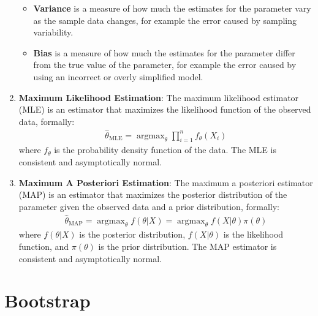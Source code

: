 \documentclass[letterpaper, 11pt]{article}
\newcommand{\1}{\mathds{1}}	%
\DeclareMathOperator*{\argmax}{argmax}		%
\theoremstyle{definition}
\begin{document}
\begin{enumerate}
\begin{itemize}
        \item \textbf{Variance} is a measure of how much the estimates for the parameter vary as the sample data changes, 
        for example the error caused by sampling variability.
        \item \textbf{Bias} is a measure of how much the estimates for the parameter differ from the true value of the parameter,
        for example the error caused by using an incorrect or overly simplified model.
    \end{itemize}
    \item \textbf{Maximum Likelihood Estimation}: The maximum likelihood estimator (MLE) is an estimator that maximizes the likelihood function of the observed data, 
    formally:
    \begin{align}
        \hat{\theta}_{\text{MLE}} = \argmax_{\theta} \prod_{i=1}^{n} f_{\theta}(X_i)
    \end{align}
    where $f_{\theta}$ is the probability density function of the data. The MLE is consistent and asymptotically normal.
    \item \textbf{Maximum A Posteriori Estimation}: The maximum a posteriori estimator (MAP) is an estimator that maximizes the posterior distribution of the parameter given the observed data
    and a prior distribution, formally:
    \begin{align}
        \hat{\theta}_{\text{MAP}} = \argmax_{\theta} f(\theta | X) = \argmax_{\theta} f(X | \theta) \pi(\theta)
    \end{align}
    where $f(\theta | X)$ is the posterior distribution, $f(X | \theta)$ is the likelihood function, and $\pi(\theta)$ is the prior distribution. The MAP estimator is consistent and asymptotically normal.

\end{enumerate}

\section{Bootstrap}
\end{document}

